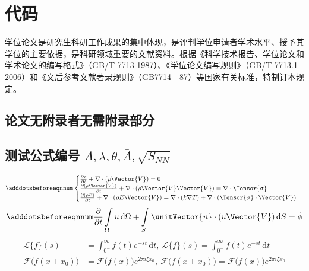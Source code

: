 \chapter{代码}

学位论文是研究生科研工作成果的集中体现，是评判学位申请者学术水平、授予其学位的主要依据，是科研领域重要的文献资料。根据《科学技术报告、学位论文和学术论文的编写格式》（GB/T 7713-1987）、《学位论文编写规则》（GB/T 7713.1-2006）和《文后参考文献著录规则》（GB7714—87）等国家有关标准，特制订本规定。

\section{论文无附录者无需附录部分}

\section{测试公式编号 \texorpdfstring{$\Lambda,\lambda,\theta,\bar{\Lambda},\sqrt{S_{NN}}$}{$\textLambda,\textlambda,\texttheta,\bar{\textLambda},\sqrt{S_{NN}}$}} \label{sec:testmath}

\begin{equation} \label{eq:appedns}
    \adddotsbeforeeqnnum%
    \begin{cases}
        \frac{\partial \rho}{\partial t} + \nabla\cdot(\rho\Vector{V}) = 0\\
        \frac{\partial (\rho\Vector{V})}{\partial t} + \nabla\cdot(\rho\Vector{V}\Vector{V}) = \nabla\cdot\Tensor{\sigma}\\
        \frac{\partial (\rho E)}{\partial t} + \nabla\cdot(\rho E\Vector{V}) = \nabla\cdot(k\nabla T) + \nabla\cdot(\Tensor{\sigma}\cdot\Vector{V})
    \end{cases}
\end{equation}
\begin{equation}
    \adddotsbeforeeqnnum%
    \frac{\partial }{\partial t}\int\limits_{\Omega} u \, \mathrm{d}\Omega + \int\limits_{S} \unitVector{n}\cdot(u\Vector{V}) \, \mathrm{d}S = \dot{\phi}
\end{equation}
\[
    \begin{split}
        \mathcal{L} \{f\}(s) &= \int _{0^{-}}^{\infty} f(t) e^{-st} \, \mathrm{d}t, \ 
        \mathscr{L} \{f\}(s) = \int _{0^{-}}^{\infty} f(t) e^{-st} \, \mathrm{d}t\\
        \mathcal{F} {\bigl (} f(x+x_{0}) {\bigr )} &= \mathcal{F} {\bigl (} f(x) {\bigr )} e^{2\pi i\xi x_{0}}, \ 
        \mathscr{F} {\bigl (} f(x+x_{0}) {\bigr )} = \mathscr{F} {\bigl (} f(x) {\bigr )} e^{2\pi i\xi x_{0}}
    \end{split}
\]



